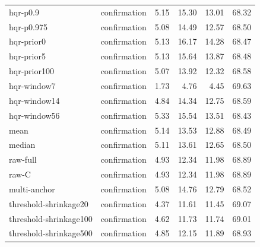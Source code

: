 \begin{longtable}{llrrrr}
hqr-p0.9 & confirmation & 5.15 & 15.30 & 13.01 & 68.32\\
hqr-p0.975 & confirmation & 5.08 & 14.49 & 12.57 & 68.50\\
hqr-prior0 & confirmation & 5.13 & 16.17 & 14.28 & 68.47\\
hqr-prior5 & confirmation & 5.13 & 15.64 & 13.87 & 68.48\\
hqr-prior100 & confirmation & 5.07 & 13.92 & 12.32 & 68.58\\
hqr-window7 & confirmation & 1.73 & 4.76 & 4.45 & 69.63\\
hqr-window14 & confirmation & 4.84 & 14.34 & 12.75 & 68.59\\
hqr-window56 & confirmation & 5.33 & 15.54 & 13.51 & 68.43\\
mean & confirmation & 5.14 & 13.53 & 12.88 & 68.49\\
median & confirmation & 5.11 & 13.61 & 12.65 & 68.50\\
raw-full & confirmation & 4.93 & 12.34 & 11.98 & 68.89\\
raw-C & confirmation & 4.93 & 12.34 & 11.98 & 68.89\\
multi-anchor & confirmation & 5.08 & 14.76 & 12.79 & 68.52\\
threshold-shrinkage20 & confirmation & 4.37 & 11.61 & 11.45 & 69.07\\
threshold-shrinkage100 & confirmation & 4.62 & 11.73 & 11.74 & 69.01\\
threshold-shrinkage500 & confirmation & 4.85 & 12.15 & 11.89 & 68.93\\
\end{longtable}\endgroup
